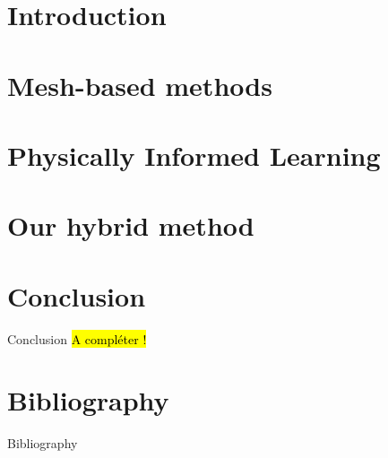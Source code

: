 \documentclass[compress,10pt,xcolor={table,dvipsnames},t]{beamer}
\begin{document}
	\section{Introduction}
	
	
	\section{Mesh-based methods}
	
	
	\section{Physically Informed Learning}
	
	
	\section{Our hybrid method}
	
	
	
%	
%	
%	
	
	\section{Conclusion} %
	
	\begin{frame}[label={lastslide}]{Conclusion}
		\hl{A compléter !}
	\end{frame}
	
	\section{Bibliography}
	
	{ 
		\begin{frame}{Bibliography}
			\small
			\printbibliography[heading=none]
		\end{frame}
	}
	\addtocounter{framenumber}{-2} 
	
	\appendix
	
	
	
\end{document}
